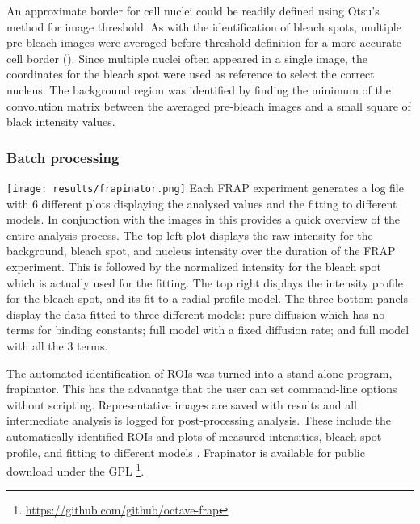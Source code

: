       An approximate border for cell nuclei could be readily defined using Otsu's method for image threshold.
      As with the identification of bleach spots, multiple pre-bleach images
      were averaged before threshold definition for a more accurate cell border ().
      Since multiple nuclei often appeared in a single image, the coordinates for the bleach spot
      were used as reference to select the correct nucleus.
      The background region was identified by finding the minimum of the convolution matrix
      between the averaged pre-bleach images and a small square of black intensity values.

    \subsubsection{Batch processing}

      \begin{sidewaysfigure}
        \texttt{[image: results/frapinator.png]}
          {
            Each FRAP experiment generates a log file with 6 different plots
            displaying the analysed values and the fitting to different models.
            In conjunction with the images in  this
            provides a quick overview of the entire analysis process.
            The top left plot displays the raw intensity
            for the background, bleach spot, and nucleus intensity over the
            duration of the FRAP experiment. This is followed by the normalized
            intensity for the bleach spot which is actually used for the
            fitting. The top right displays the intensity
            profile for the bleach spot, and its fit to a radial profile
            model. The three bottom panels display the data fitted to three
            different models: pure diffusion which has no terms for binding
            constants; full model with a fixed diffusion rate; and full model
            with all the 3 terms.
          }
        \label{fig:kill-frap:frapinator}
      \end{sidewaysfigure}

      The automated identification of ROIs was turned into a stand-alone program, frapinator.
      This has the advanatge that the user can set command-line options without scripting.
      Representative images are saved with results and all intermediate analysis is logged for post-processing analysis.
      These include the automatically identified ROIs and
      plots of measured intensities, bleach spot profile, and fitting to different models .
      Frapinator is available for public download under the GPL \footnote{\url{https://github.com/github/octave-frap}}.

